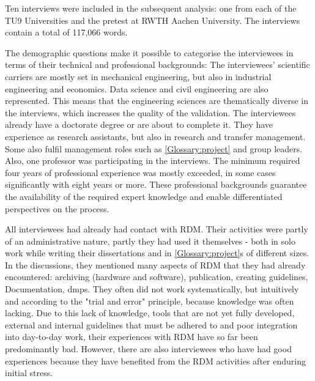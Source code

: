 \documentclass{bausteinefdm}
\begin{document}

Ten interviews were included in the subsequent analysis: one from each of the TU9 Universities and the pretest at RWTH Aachen University.
The interviews contain a total of 117,066 words.%

The demographic questions make it possible to categorise the interviewees in terms of their technical and professional backgrounds: 
The interviewees' scientific carriers are mostly set in mechanical engineering, but also in industrial engineering and economics. 
Data science and civil engineering are also represented. 
This means that the engineering sciences are thematically diverse in the interviews, which increases the quality of the validation.
The interviewees already have a doctorate degree or are about to complete it. 
They have experience as research assistants, but also in research and transfer management. 
Some also fulfil management roles such as \ref{Glossary:project} and group leaders. 
Also, one professor was participating in the interviews.
The minimum required four years of professional experience was mostly exceeded, in some cases significantly with eight years or more. 
These professional backgrounds guarantee the availability of the required expert knowledge and enable differentiated perspectives on the process.

All interviewees had already had contact with RDM. Their activities were partly of an administrative nature, partly they had used it themselves - both in solo work while writing their dissertations and in \ref{Glossary:project}s of different sizes. In the discussions, they mentioned many aspects of RDM that they had already encountered: archiving (hardware and software), publication, creating guidelines, Documentation, \ac{dmp}s. They often did not work systematically, but intuitively and according to the "trial and error" principle, because knowledge was often lacking. Due to this lack of knowledge, tools that are not yet fully developed, external and internal guidelines that must be adhered to and poor integration into day-to-day work, their experiences with RDM have so far been predominantly bad. However, there are also interviewees who have had good experiences because they have benefited from the RDM activities after enduring initial stress.
\end{document}
